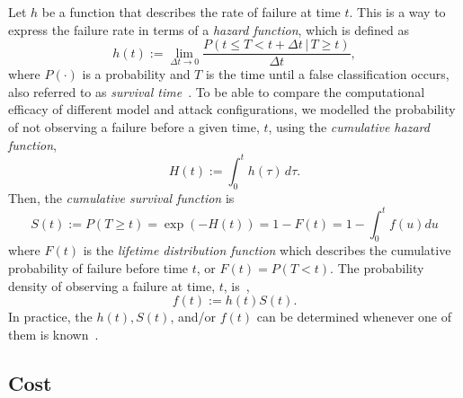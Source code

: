 Let $h$ be a function that describes the rate of failure at time $t$.
This is a way to express the failure rate in terms of a \textit{hazard function}, which is defined as
\begin{equation}
    h(t) := \lim_{ \Delta t \rightarrow 0} \frac{P(t \leq T < t + \Delta t \,|\, T \geq t)}{\Delta t},
    \label{eq:failure_rate_h}
\end{equation}
where  $P(\cdot)$ is a probability and $T$ is the time until a false classification occurs, also referred to as \textit{survival time}~\cite{kleinbaum1996survival}. To be able to compare the computational efficacy of different model and attack configurations, we modelled the probability of not observing a failure before a given time, $t$, using the \textit{cumulative hazard function},
\begin{equation}
     H(t) := \int_0^{t} h(\tau) \,d\tau.
     \label{eq:cdf}
\end{equation}
Then, the \textit{cumulative survival function} is
\begin{equation}
    S(t) := P(T \geq t) = \exp(-H(t)) = 1 - F(t) = 1-   \int_0^t f(u)du
    \label{eq:S(t)}
\end{equation}
where $F(t)$ is the \textit{lifetime distribution function} which describes the cumulative probability of failure before time $t$, or $F(t) = P(T < t)$.
The probability density of observing a failure at time, $t$, is~\cite{kleinbaum1996survival},
\begin{equation*}
    f(t) := h(t)S(t).
    \label{eq:pdf}
\end{equation*}
In practice, the $h(t), S(t)$, and/or $f(t)$ can be determined whenever one of them is known~\cite{kleinbaum1996survival}.

\subsection{Cost}
\label{cost}

